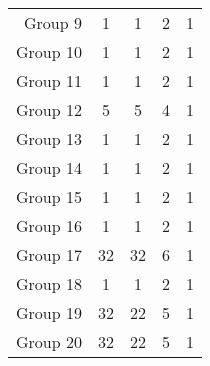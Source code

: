 \begin{table}[H]
\begin{tabular}{@{}rcccc@{}}
        Group 9  & 1                               & 1                                         & 2                                          & 1                                      \\
        Group 10 & 1                               & 1                                         & 2                                          & 1                                      \\
        Group 11 & 1                               & 1                                         & 2                                          & 1                                      \\
        Group 12 & 5                               & 5                                         & 4                                          & 1                                      \\
        Group 13 & 1                               & 1                                         & 2                                          & 1                                      \\
        Group 14 & 1                               & 1                                         & 2                                          & 1                                      \\
        Group 15 & 1                               & 1                                         & 2                                          & 1                                      \\
        Group 16 & 1                               & 1                                         & 2                                          & 1                                      \\
        Group 17 & 32                              & 32                                        & 6                                          & 1                                      \\
        Group 18 & 1                               & 1                                         & 2                                          & 1                                      \\
        Group 19 & 32                              & 22                                        & 5                                          & 1                                      \\
        Group 20 & 32                              & 22                                        & 5                                          & 1                                      \\

\end{tabular}
\end{table}
